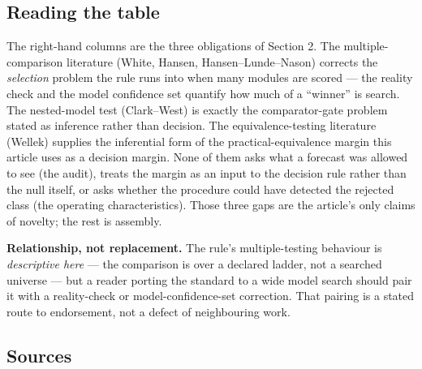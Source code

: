 \documentclass[11pt]{article}
\begin{document}
\subsection{Reading the table}\label{reading-the-table}

The right-hand columns are the three obligations of Section 2. The
multiple- comparison literature (White, Hansen, Hansen--Lunde--Nason)
corrects the \emph{selection} problem the rule runs into when many
modules are scored --- the reality check and the model confidence set
quantify how much of a ``winner'' is search. The nested-model test
(Clark--West) is exactly the comparator-gate problem stated as inference
rather than decision. The equivalence-testing literature (Wellek)
supplies the inferential form of the practical-equivalence margin this
article uses as a decision margin. None of them asks what a forecast was
allowed to see (the audit), treats the margin as an input to the
decision rule rather than the null itself, or asks whether the procedure
could have detected the rejected class (the operating characteristics).
Those three gaps are the article's only claims of novelty; the rest is
assembly.

\textbf{Relationship, not replacement.} The rule's multiple-testing
behaviour is \emph{descriptive here} --- the comparison is over a
declared ladder, not a searched universe --- but a reader porting the
standard to a wide model search should pair it with a reality-check or
model-confidence-set correction. That pairing is a stated route to
endorsement, not a defect of neighbouring work.

\subsection{Sources}\label{sources}
\end{document}
